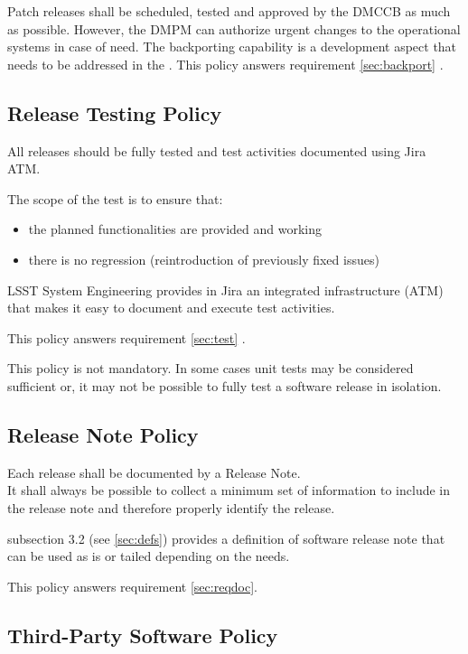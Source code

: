 Patch releases shall be scheduled, tested and approved by the DMCCB as much as possible.
However, the DMPM can authorize urgent changes to the operational systems in case of need.
The backporting capability is a development aspect that needs to be addressed in the .
This policy answers requirement  \ref{sec:backport} .


\subsection{Release Testing Policy} \label{sec:testpolicy}

All releases should be fully tested and test activities documented using Jira ATM.

The scope of the test is to ensure that:

\begin{itemize}
\item the planned functionalities are provided and working
\item there is no regression (reintroduction of previously fixed issues)
\end{itemize}

LSST System Engineering provides in Jira an integrated infrastructure (ATM) that makes it easy to document and execute test activities.

This policy answers requirement \ref{sec:test} .

This policy is not mandatory.
In some cases unit tests may be considered sufficient or, it may not be possible to fully test a software release in isolation.


\subsection{Release Note Policy} \label{sec:notepolicy}

Each release shall be documented by a Release Note.\\
It shall always be possible to collect a minimum set of information to include in the release note and therefore properly identify the release.

 subsection 3.2 (see \ref{sec:defs}) provides a definition of software release note that can be used as is or tailed depending on the needs.

This policy answers requirement \ref{sec:reqdoc}.


\subsection{Third-Party Software Policy} \label{sec:thirdpolicy}

